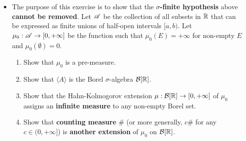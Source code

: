 \documentclass[11pt]{article}
\begin{document}
\begin{itemize}
\item \begin{exercise} The purpose of this exercise is to show that the \textbf{$\sigma$-finite hypothesis} above \textbf{cannot be removed}. Let ${\mathscr A}$ be the
collection of all subsets in ${\mathbb R}$ that can be expressed as finite unions of half-open intervals $[a, b)$. Let $\mu_0 : {\mathscr A} \rightarrow [0, +\infty]$ be the function such
that $\mu_0(E) = +\infty$ for non-empty $E$ and $\mu_0(\emptyset) = 0$.
\begin{enumerate}
\item Show that $\mu_0$ is a pre-measure.
\item Show that $\langle A \rangle$ is the Borel $\sigma$-algebra ${\mathcal B}[{\mathbb R}]$.
\item Show that the Hahn-Kolmogorov extension $\mu: {\mathcal B}[{\mathbb R}] \rightarrow [0, +\infty]$ of $\mu_0$ assigns an \textbf{infinite measure} to any non-empty Borel set.
\item Show that \textbf{counting measure} $\#$ (or more generally, $c\#$ for any $c \in (0, +\infty]$) is \textbf{another extension} of $\mu_0$ on ${\mathcal B}[{\mathbb R}]$.
\end{enumerate}
\end{exercise}
\end{itemize}




\newpage


\end{document}
